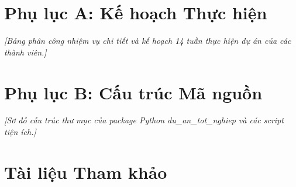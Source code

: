\documentclass[12pt, a4paper]{report}
\begin{document}
\newpage
\chapter*{Phụ lục A: Kế hoạch Thực hiện}
\label{app:kehoach}
\textit{[Bảng phân công nhiệm vụ chi tiết và kế hoạch 14 tuần thực hiện dự án của các thành viên.]}


\chapter*{Phụ lục B: Cấu trúc Mã nguồn}
\label{app:code}
\textit{[Sơ đồ cấu trúc thư mục của package Python du\_an\_tot\_nghiep và các script tiện ích.]}


\chapter*{Tài liệu Tham khảo}
\label{chap:thamkhao}
\end{document}
